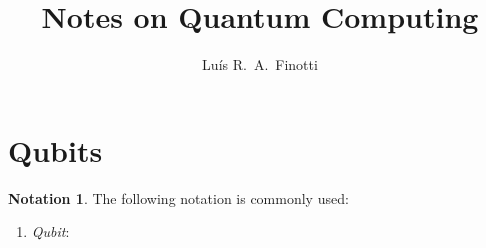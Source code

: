 \documentclass[12pt]{amsart}
\title{Notes on Quantum Computing}
\author{Luís R.~A.~Finotti}
\theoremstyle{plain}
\theoremstyle{definition}
\newtheorem{notation}[theorem]{Notation}
\theoremstyle{remarks}
\newcommand{\mi}{\mathrm{i}}
\newcommand{\idef}{\overset{{\rm def}}{=}}
\begin{document}
\maketitle

\tableofcontents

\section{Qubits}

\begin{notation}
  The following notation is commonly used:

  \begin{enumerate}[itemsep=2ex]

  \item{} \emph{Qubit}:
    \begin{align*}
    \end{align*}


\end{enumerate}
\end{notation}
\end{document}
